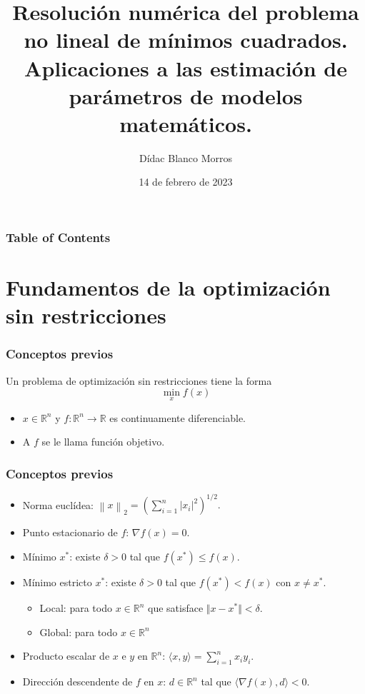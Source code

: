 \documentclass{beamer}
\title
{Resolución numérica del problema no lineal de mínimos cuadrados.
Aplicaciones a las estimación de parámetros de modelos matemáticos.}
\author
{Dídac Blanco Morros}
\date
{14 de febrero de 2023}
\newcommand{\norm}[1]{\left\lVert#1\right\rVert}
\begin{document}
\frame{\titlepage}

\begin{frame}
\frametitle{Table of Contents} %
\tableofcontents
\end{frame}

\section{Fundamentos de la optimización sin restricciones}
\begin{frame}
    \frametitle{Conceptos previos}
    \begin{block}{}
        Un \alert{problema de optimización sin restricciones} tiene la forma
        \begin{equation*}
            \min_x f(x)
        \end{equation*}
        \end{block}
    \begin{itemize}
        \item $x\in \mathbb{R}^n$ y $f:\mathbb{R}^n \to \mathbb{R}$ es continuamente diferenciable.
        \item A $f$ se le llama función objetivo.
    \end{itemize}
\end{frame}

\begin{frame}
    \frametitle{Conceptos previos}
    \begin{itemize}
    \item Norma euclídea: $
            \norm{x}_2 = \left( \sum_{i=1}^n \vert x_i \vert^2 \right)^{1/2}.
        $
    \item Punto estacionario de $f$: $\nabla f(x) = 0$.
    \item Mínimo $x^*$: existe $\delta > 0$ tal que $f(x^*) \leq f(x)$.
    \item Mínimo estricto $x^*$: existe $\delta > 0$ tal que $f(x^*) < f(x)$ con $x \neq x^*$.
    \begin{itemize}
        \item Local: para todo $x \in \mathbb{R}^n$ que satisface $\Vert x - x^* \Vert < \delta$. 
        \item Global: para todo $x \in \mathbb{R}^n$
    \end{itemize}
    \item Producto escalar de $x$ e $y$ en $\mathbb{R}^n$: $\langle x,y \rangle = \sum_{i=1}^n x_i y_i$.
    \item Dirección descendente de $f$ en $x$: $d \in \mathbb{R}^n$ tal que $\langle \nabla f(x), d \rangle < 0$.
    \end{itemize}
\end{frame}
\end{document}
